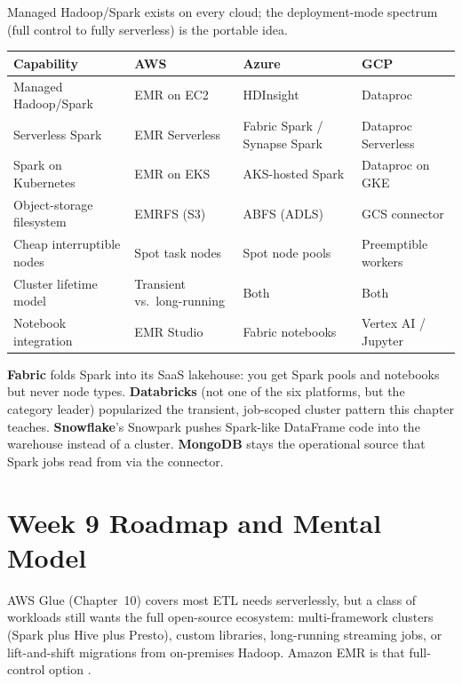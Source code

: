 \begin{crosscloud}
Managed Hadoop/Spark exists on every cloud; the deployment-mode spectrum (full control to fully serverless) is the portable idea.

\vspace{2mm}
{\footnotesize
\begin{tabular}{@{}p{2.8cm}p{3.0cm}p{3.0cm}p{3.0cm}@{}}
\toprule
\textbf{Capability} & \textbf{AWS} & \textbf{Azure} & \textbf{GCP} \\
\midrule
Managed Hadoop/Spark & EMR on EC2 & HDInsight & Dataproc \\
Serverless Spark & EMR Serverless & Fabric Spark / Synapse Spark & Dataproc Serverless \\
Spark on Kubernetes & EMR on EKS & AKS-hosted Spark & Dataproc on GKE \\
Object-storage filesystem & EMRFS (S3) & ABFS (ADLS) & GCS connector \\
Cheap interruptible nodes & Spot task nodes & Spot node pools & Preemptible workers \\
\addlinespace
Cluster lifetime model & Transient vs.\ long-running & Both & Both \\
Notebook integration & EMR Studio & Fabric notebooks & Vertex AI / Jupyter \\
\bottomrule
\end{tabular}}

\vspace{1mm}
\textbf{Fabric} folds Spark into its SaaS lakehouse: you get Spark pools and notebooks but never node types. \textbf{Databricks} (not one of the six platforms, but the category leader) popularized the transient, job-scoped cluster pattern this chapter teaches. \textbf{Snowflake}'s Snowpark pushes Spark-like DataFrame code into the warehouse instead of a cluster. \textbf{MongoDB} stays the operational source that Spark jobs read from via the connector.
\end{crosscloud}

\section{Week 9 Roadmap and Mental Model}
AWS Glue (Chapter~10) covers most ETL needs serverlessly, but a class of workloads still wants the full open-source ecosystem: multi-framework clusters (Spark plus Hive plus Presto), custom libraries, long-running streaming jobs, or lift-and-shift migrations from on-premises Hadoop. Amazon EMR is that full-control option \cite{awsEMRDocs}.

